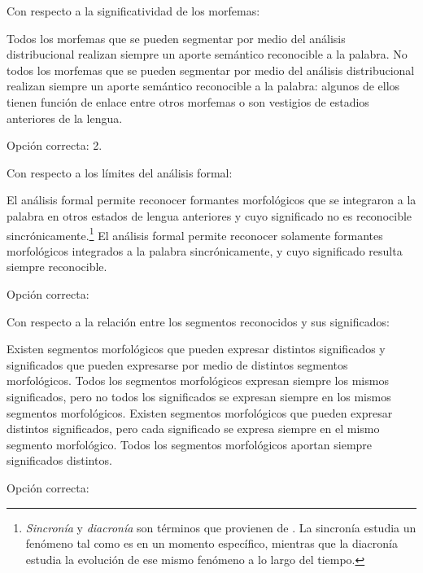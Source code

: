 \begin{ejercicio}[Terraplanistas]
\begin{consignas}
  \item Con respecto a la significatividad de los morfemas:
        \begin{exe}
          \ex Todos los morfemas que se pueden segmentar por medio del análisis
              distribucional realizan siempre un aporte semántico reconocible a
              la palabra.
          \ex No todos los morfemas que se pueden segmentar por medio del
              análisis distribucional realizan siempre un aporte semántico
              reconocible a la palabra: algunos de ellos tienen función de
              enlace entre otros morfemas o son vestigios de estadios anteriores
              de la lengua.
        \end{exe}
        \begin{resuelto}
        Opción correcta: 2.
        \end{resuelto}
  \item Con respecto a los límites del análisis formal:
        \begin{exe}
          \ex El análisis formal permite reconocer formantes morfológicos que se
              integraron a la palabra en otros estados de lengua anteriores y
              cuyo significado no es reconocible
              sincrónicamente.\footnote{\textit{Sincronía} y \textit{diacronía}
              son términos que provienen de \textcite{saussure1945}. La
              sincronía estudia un fenómeno tal como es en un momento
              específico, mientras que la diacronía estudia la evolución de ese
              mismo fenómeno a lo largo del tiempo.}
          \ex El análisis formal permite reconocer solamente formantes
              morfológicos integrados a la palabra sincrónicamente, y cuyo
              significado resulta siempre reconocible.
        \end{exe}
        Opción correcta:\completar[1]
  \item Con respecto a la relación entre los segmentos reconocidos y sus
        significados:
        \begin{exe}
          \ex Existen segmentos morfológicos que pueden expresar distintos
              significados y significados que pueden expresarse por medio de
              distintos segmentos morfológicos.
          \ex Todos los segmentos morfológicos expresan siempre los mismos
              significados, pero no todos los significados se expresan siempre
              en los mismos segmentos morfológicos.
          \ex Existen segmentos morfológicos que pueden expresar distintos
              significados, pero cada significado se expresa siempre en el mismo
              segmento morfológico.
          \ex Todos los segmentos morfológicos aportan siempre significados
              distintos.
        \end{exe}
        Opción correcta:\completar[1]
\end{consignas}
\end{ejercicio}

